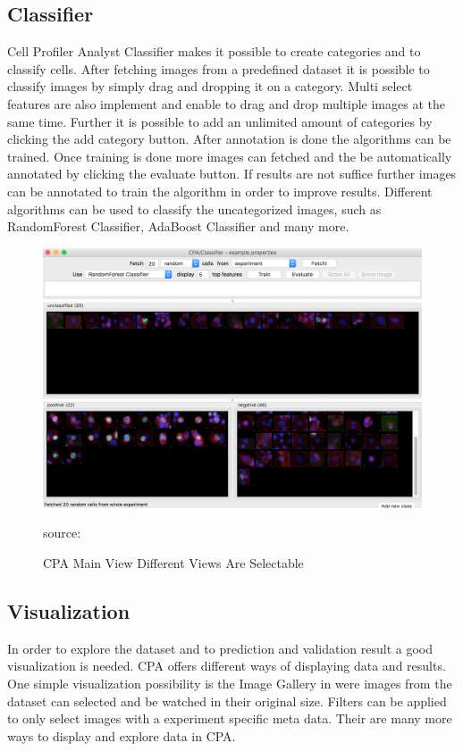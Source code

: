 \subsection{Classifier}
Cell Profiler Analyst Classifier makes it possible to create categories and to classify cells. After fetching images from a predefined dataset it is possible to classify images by simply drag and dropping it on a category. Multi select features are also implement and enable to drag and drop multiple images at the same time. Further it is possible to add an unlimited amount of categories by clicking the add category button. After annotation is done the algorithms can be trained. Once training is done more images can fetched and the be automatically annotated by clicking the evaluate button. If results are not suffice further images can be annotated to train the algorithm in order to improve results. Different algorithms can be used to classify the uncategorized images, such as RandomForest Classifier, AdaBoost Classifier and many more.

\begin{figure}[H]
	\centering
	\includegraphics[width=0.7\linewidth]{bilder/related_work/classifier.png}
	\caption{CPA Main View Different Views Are Selectable} source:\cite{ReactLogo}
	\label{fig:RL}
\end{figure}


\subsection{Visualization}


In order to explore the dataset and to prediction and validation result a good visualization is needed. CPA offers different ways of displaying data and results. One simple visualization possibility is the Image Gallery in were images from the dataset can selected and be watched in their original size. Filters can be applied to only select images with a experiment specific meta data. Their are many more ways to display and explore data in CPA.

